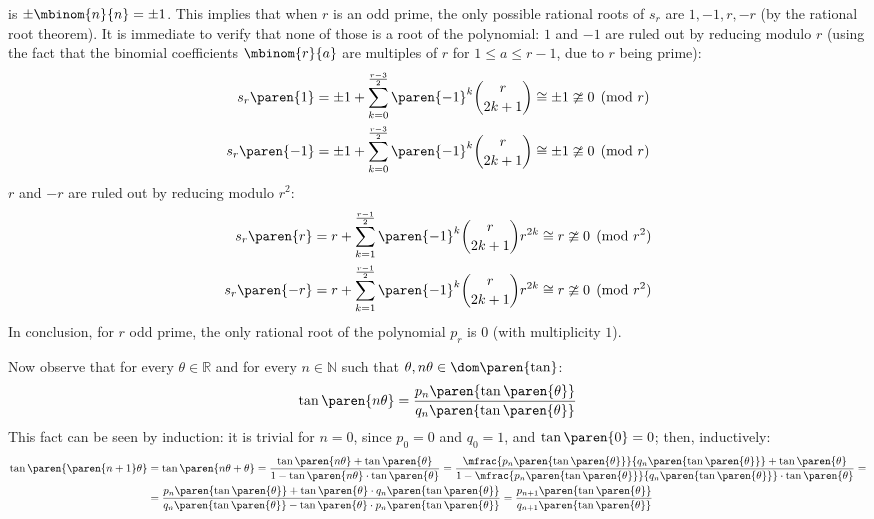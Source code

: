 is $\pm \mbinom{n}{n} = \pm 1$.
This implies that when $r$ is an odd prime,
the only possible rational roots of $s_r$ are $1, -1, r, -r$
(by the rational root theorem).
It is immediate to verify that none of those is a root of the polynomial:
$1$ and $-1$ are ruled out by reducing modulo $r$
(using the fact that the binomial coefficients $\mbinom{r}{a}$
are multiples of $r$ for $1 \leq a \leq r-1$,
due to $r$ being prime):
\begin{align*}
  s_r\paren{1}
  &= \pm 1 + \sum\limits_{k=0}^{\frac{r-3}{2}}
     {\paren{-1}^{k} \binom{r}{2 k + 1}}
   \cong \pm 1 \ncong 0 \pmod{r}
  \\
  s_r\paren{-1}
  &= \pm 1 + \sum\limits_{k=0}^{\frac{r-3}{2}}
     {\paren{-1}^{k} \binom{r}{2 k + 1}}
   \cong \pm 1 \ncong 0 \pmod{r}
\end{align*}
$r$ and $-r$ are ruled out by reducing modulo $r^2$:
\begin{align*}
  s_r\paren{r}
  &= r + \sum\limits_{k=1}^{\frac{r-1}{2}}
     {\paren{-1}^{k} \binom{r}{2 k + 1} r^{2 k}}
   \cong r \ncong 0 \pmod{r^2} \\
  s_r\paren{-r}
  &= r + \sum\limits_{k=1}^{\frac{r-1}{2}}
     {\paren{-1}^{k} \binom{r}{2 k + 1} r^{2 k}}
   \cong r \ncong 0 \pmod{r^2}
\end{align*}
In conclusion, for $r$ odd prime,
the only rational root of the polynomial $p_r$ is $0$ (with multiplicity $1$).


Now observe that for every $\theta \in \mathbb{R}$ and for every $n \in \mathbb{N}$
such that $\theta, n \theta \in \dom\paren{\tan}$:
\begin{equation*}
 \tan\paren{n \theta}
 = \frac{p_n\paren{\tan\paren{\theta}}}
        {q_n\paren{\tan\paren{\theta}}}
\end{equation*}
This fact can be seen by induction:
it is trivial for $n = 0$, since $p_0 = 0$ and $q_0 = 1$,
and $\tan\paren{0} = 0$; then, inductively:
\begin{align*}
  \tan\paren{\paren{n + 1} \theta}
  &= \tan\paren{n \theta + \theta}
   = \frac{\tan\paren{n \theta} + \tan\paren{\theta}}
         {1 - \tan\paren{n \theta} \cdot \tan\paren{\theta}}
   = \frac{\mfrac{p_n\paren{\tan\paren{\theta}}}
                 {q_n\paren{\tan\paren{\theta}}}
           + \tan\paren{\theta}}
          {1 - \mfrac{p_n\paren{\tan\paren{\theta}}}
                     {q_n\paren{\tan\paren{\theta}}}
               \cdot \tan\paren{\theta}} = \\
  &= \frac{p_n\paren{\tan\paren{\theta}} + \tan\paren{\theta} \cdot q_n\paren{\tan\paren{\theta}}}
          {q_n\paren{\tan\paren{\theta}} - \tan\paren{\theta} \cdot p_n\paren{\tan\paren{\theta}}}
   = \frac{p_{n+1}\paren{\tan\paren{\theta}}}
          {q_{n+1}\paren{\tan\paren{\theta}}}
\end{align*}

